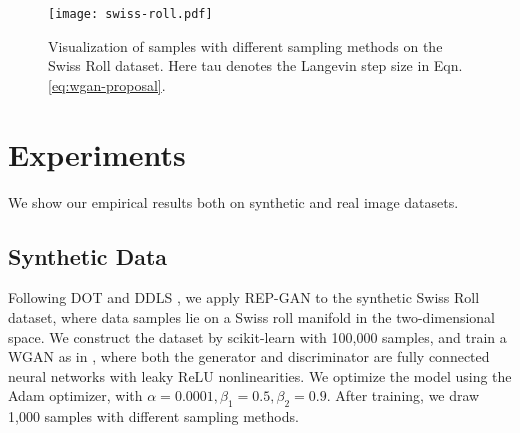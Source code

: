 \documentclass{article} %
\newcommand{\<}{\left\langle}
\renewcommand{\>}{\right\rangle}
\begin{document}
\begin{figure}[t]
    \centering
    \texttt{[image: swiss-roll.pdf]}
    \caption{Visualization of samples with different sampling methods on the Swiss Roll dataset. Here tau denotes the Langevin step size in Eqn. \eqref{eq:wgan-proposal}.}
    \label{fig:swissroll}
\end{figure}



\section{Experiments}
\label{sec:experiments}
We show our empirical results both on synthetic and real image datasets.

\subsection{Synthetic Data}
Following DOT \citep{tanaka2019discriminator} and DDLS \citep{che2020your}, we apply REP-GAN to the synthetic Swiss Roll dataset, where data samples lie on a Swiss roll manifold in the two-dimensional space. We construct the dataset by scikit-learn with 100,000 samples, and train a WGAN as in \cite{tanaka2019discriminator}, where both the generator and discriminator are fully connected neural networks with leaky ReLU nonlinearities. We optimize the model using the Adam optimizer, with $\alpha = 0.0001, \beta_1 = 0.5, \beta_2 = 0.9$.
After training, we draw 1,000 samples with different sampling methods. 
\end{document}
